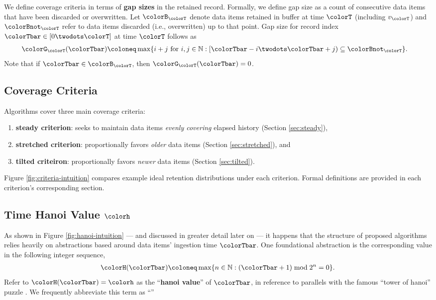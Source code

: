 We define coverage criteria in terms of \textbf{gap sizes} in the retained record.
Formally, we define gap size as a count of consecutive data items that have been discarded or overwritten.
Let $\colorB_{\colorT}$ denote data items retained in buffer at time $\colorT$ (including $v_{\colorT}$) and $\colorBnot_{\colorT}$ refer to data items discarded (i.e., overwritten) up to that point.
Gap size for record index $\colorTbar \in [0 \twodots \colorT]$ at time $\colorT$ follows as
\begin{align}
\colorG_{\colorT}(\colorTbar)
&\coloneq
\max
\{
  i + j
  \text{ for }
  i, j \in \mathbb{N}
  :
  [\colorTbar-i \twodots \colorTbar+j) \subseteq \colorBnot_{\colorT}
\}.
\label{eqn:gap-size-defn}
\end{align}
Note that if $\colorTbar \in \colorB_{\colorT}$, then $\colorG_{\colorT}(\colorTbar) = 0$.

\subsection{Coverage Criteria}
\label{sec:notation-coverage}

Algorithms cover three main coverage criteria:
\begin{enumerate}
\item \textbf{steady criterion}: seeks to maintain data items \textit{evenly covering} elapsed history (Section \ref{sec:steady}),
\item \textbf{stretched criterion}: proportionally favors \textit{older} data items (Section \ref{sec:stretched}), and
\item \textbf{tilted criteiron}: proportionally favors \textit{newer} data items (Section \ref{sec:tilted}).
\end{enumerate}
Figure \ref{fig:criteria-intuition} compares example ideal retention distributions under each criterion.
Formal definitions are provided in each criterion's corresponding section.

\subsection{Time Hanoi Value $\colorh$}
\label{sec:notation-hanoi}

As shown in Figure \ref{fig:hanoi-intuition} --- and discussed in greater detail later on --- it happens that the structure of proposed algorithms relies heavily on abstractions based around data items' ingestion time $\colorTbar$.
One foundational abstraction is the corresponding value in the following integer sequence,
\begin{align}
\colorH(\colorTbar)
\coloneq
\max \{ n \in \mathbb{N} : (\colorTbar + 1) \bmod 2^n = 0 \}.
\label{eqn:hanoi-defn}
\end{align}
Refer to $\colorH(\colorTbar) = \colorh$ as the ``\textbf{hanoi value}'' of $\colorTbar$, in reference to parallels with the famous ``tower of hanoi'' puzzle \citep{lucas1889jeux}.
We frequently abbreviate this term as ``\textbf{\hv{}}''

